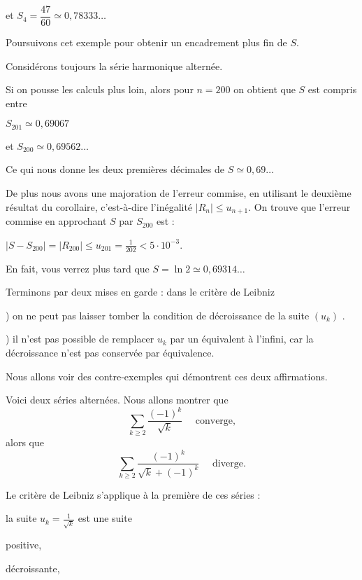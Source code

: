 et $S_4 = \dfrac{47}{60} \simeq 0,78333\ldots$

Poursuivons cet exemple pour obtenir un encadrement plus fin de $S$.


\diapo

Considérons toujours la série harmonique alternée.

\change  
Si on pousse les calculs plus loin, alors pour $n=200$ on obtient que $S$ est compris entre 

$S_{201} \simeq 0,69067$

et $S_{200} \simeq 0,69562\ldots$

\change  
Ce qui nous donne les deux premières décimales de $S \simeq 0,69\ldots$

\change  
De plus nous avons une majoration de l'erreur commise, en utilisant le deuxième résultat du corollaire, c'est-à-dire l'inégalité $|R_n|\le u_{n+1}$.
On trouve que l'erreur commise en approchant $S$ par $S_{200}$ est :

\change  
$|S-S_{200}| = |R_{200}| \le u_{201} = \frac{1}{202} < 5 \cdot 10^{-3}$.

En fait, vous verrez plus tard que $S=\ln 2 \simeq 0,69314\ldots$

\diapo

Terminons par deux mises en garde : dans le critère
de Leibniz

) on ne peut pas laisser tomber la condition de décroissance de la suite $(u_k)$ .

) il n'est pas possible de remplacer $u_k$ par un équivalent à l'infini, car la décroissance n'est pas conservée par équivalence.   

Nous allons voir des contre-exemples qui démontrent ces deux affirmations.

\diapo
Voici deux séries alternées. Nous allons montrer que 
$$
\sum_{k \ge 2}  \frac{(-1)^k}{\sqrt{k}}
\quad \text{ converge,}$$
alors que
$$
\sum_{k \ge 2}  \frac{(-1)^k}{\sqrt{k}+(-1)^k}
\quad \text{ diverge.}
$$ 

\change
Le critère de Leibniz s'applique à la première de ces séries :

\change
la suite $u_k = \frac{1}{\sqrt k}$ est une suite 

\change
positive, 

\change
décroissante, 

